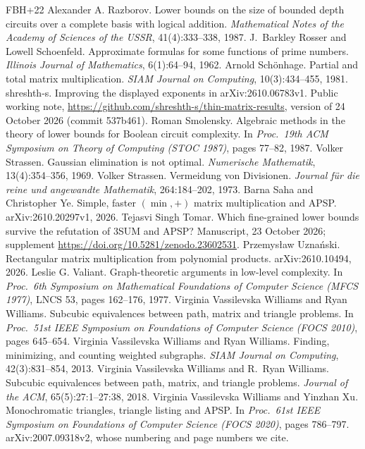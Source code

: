 \documentclass[11pt]{article}
\theoremstyle{definition}
\theoremstyle{remark}
\begin{document}
{\begin{thebibliography}{FBH{+}22}
 Alexander A. Razborov. Lower bounds on the size of bounded depth circuits over a complete basis with logical addition. \emph{Mathematical Notes of the Academy of Sciences of the USSR}, 41(4):333--338, 1987.
 J.~Barkley Rosser and Lowell Schoenfeld. Approximate formulas for some functions of prime numbers. \emph{Illinois Journal of Mathematics}, 6(1):64--94, 1962.
 Arnold Schönhage. Partial and total matrix multiplication. \emph{SIAM Journal on Computing}, 10(3):434--455, 1981.
 shreshth-s. Improving the displayed exponents in arXiv:2610.06783v1. Public working note, \url{https://github.com/shreshth-s/thin-matrix-results}, version of 24 October 2026 (commit 537b461).
 Roman Smolensky. Algebraic methods in the theory of lower bounds for Boolean circuit complexity. In \emph{Proc.\ 19th ACM Symposium on Theory of Computing (STOC 1987)}, pages 77--82, 1987.
 Volker Strassen. Gaussian elimination is not optimal. \emph{Numerische Mathematik}, 13(4):354--356, 1969.
 Volker Strassen. Vermeidung von Divisionen. \emph{Journal f\"ur die reine und angewandte Mathematik}, 264:184--202, 1973.
 Barna Saha and Christopher Ye. Simple, faster $(\min,+)$ matrix multiplication and APSP. arXiv:2610.20297v1, 2026.
 Tejasvi Singh Tomar. Which fine-grained lower bounds survive the refutation of 3SUM and APSP? Manuscript, 23 October 2026; supplement \url{https://doi.org/10.5281/zenodo.23602531}.
 Przemys\l{}aw Uzna\'nski. Rectangular matrix multiplication from polynomial products. arXiv:2610.10494, 2026.
 Leslie G. Valiant. Graph-theoretic arguments in low-level complexity. In \emph{Proc.\ 6th Symposium on Mathematical Foundations of Computer Science (MFCS 1977)}, LNCS 53, pages 162--176, 1977.
 Virginia Vassilevska Williams and Ryan Williams. Subcubic equivalences between path, matrix and triangle problems. In \emph{Proc.\ 51st IEEE Symposium on Foundations of Computer Science (FOCS 2010)}, pages 645--654.
 Virginia Vassilevska Williams and Ryan Williams. Finding, minimizing, and counting weighted subgraphs. \emph{SIAM Journal on Computing}, 42(3):831--854, 2013.
 Virginia Vassilevska Williams and R.~Ryan Williams. Subcubic equivalences between path, matrix, and triangle problems. \emph{Journal of the ACM}, 65(5):27:1--27:38, 2018.
 Virginia Vassilevska Williams and Yinzhan Xu. Monochromatic triangles, triangle listing and APSP. In \emph{Proc.\ 61st IEEE Symposium on Foundations of Computer Science (FOCS 2020)}, pages 786--797. arXiv:2007.09318v2, whose numbering and page numbers we cite.

\end{thebibliography}}
\end{document}
